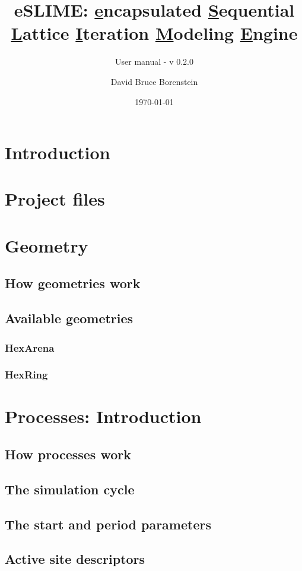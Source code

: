 \documentclass[12pt]{scrartcl}
\title{eSLIME: \underline{e}ncapsulated \underline{S}equential \underline{L}attice \underline{I}teration \underline{M}odeling \underline{E}ngine}
\subtitle{User manual - v 0.2.0}
\author{David Bruce Borenstein}
\date{\today}
\begin{document}
\maketitle

\setcounter{tocdepth}{2}
\tableofcontents

\section{Introduction}

\section{Project files}

\section{Geometry}
\subsection{How geometries work}
\subsection{Available geometries}
\subsubsection{HexArena}
\subsubsection{HexRing}

\section{Processes: Introduction}
\subsection{How processes work}
\subsection{The simulation cycle}
\subsection{The start and period parameters}
\subsection{Active site descriptors}
\end{document}
